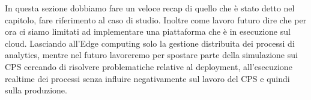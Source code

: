 In questa sezione dobbiamo fare un veloce recap di quello che è stato detto nel capitolo, fare riferimento al caso di studio.
Inoltre come lavoro futuro dire che per ora ci siamo limitati ad implementare una piattaforma che è in esecuzione sul cloud. Lasciando all'Edge computing solo la gestione distribuita dei processi di analytics, mentre nel futuro lavoreremo per spostare parte della simulazione sui CPS cercando di risolvere problematiche relative al deployment, all'esecuzione realtime dei processi senza influire negativamente sul lavoro del CPS e quindi sulla produzione. 